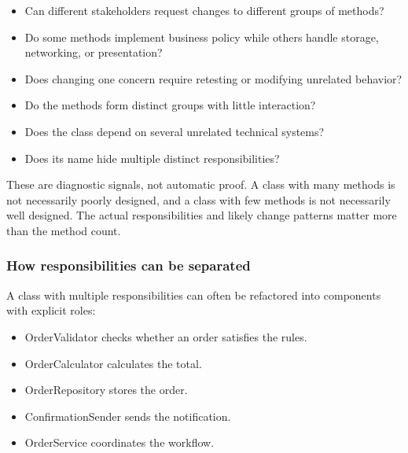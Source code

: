 \documentclass[12pt,a4paper]{article}
\begin{document}
\begin{itemize}

\item Can different stakeholders request changes to different groups of methods?

\item Do some methods implement business policy while others handle storage, networking, or presentation?

\item Does changing one concern require retesting or modifying unrelated behavior?

\item Do the methods form distinct groups with little interaction?

\item Does the class depend on several unrelated technical systems?

\item Does its name hide multiple distinct responsibilities?

\end{itemize}

These are diagnostic signals, not automatic proof. A class with many methods is not necessarily poorly designed, and a class with few methods is not necessarily well designed. The actual responsibilities and likely change patterns matter more than the method count.

\subsubsection{How responsibilities can be separated}

A class with multiple responsibilities can often be refactored into components with explicit roles:

\begin{itemize}

\item OrderValidator checks whether an order satisfies the rules.

\item OrderCalculator calculates the total.

\item OrderRepository stores the order.

\item ConfirmationSender sends the notification.

\item OrderService coordinates the workflow.

\end{itemize}
\end{document}
